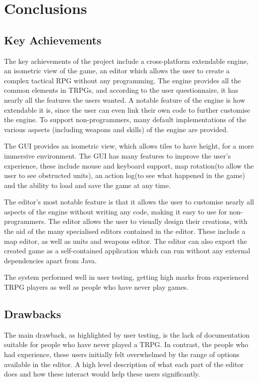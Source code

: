 \section{Conclusions}

\subsection{Key Achievements}

The key achievements of the project include a cross-platform extendable engine, an isometric view of the game, an editor which allows the user to create a complex tactical RPG without any programming. The engine provides all the common elements in TRPGs, and according to the user questionnaire, it has nearly all the features the users wanted.  A notable feature of the engine is how extendable it is, since the user can even link their own code to further customise the engine. To support non-programmers, many default implementations of the various aspects (including weapons and skills) of the engine are provided. 

The GUI provides an isometric view, which allows tiles to have height, for a more immersive environment. The GUI has many features to improve the user's experience, these include mouse and keyboard support, map rotation(to allow the user to see obstructed units), an action log(to see what happened in the game) and the ability to load and save the game at any time.

The editor's most notable feature is that it allows the user to customise nearly all aspects of the engine without writing any code, making it easy to use for non-programmers.  The editor allows the user to visually design their creations,  with the aid of the many specialised editors contained in the editor. These include a map editor, as well as units and weapons editor.  The editor can also export the created game as a self-contained application which can run without any external dependencies apart from Java.

The system performed well in user testing, getting high marks from experienced TRPG players as well as people who have never play games.

\subsection{Drawbacks}
The main drawback, as highlighted by user testing, is the lack of documentation suitable for people who have never played a TRPG. In contrast, the people who had experience, these users initially felt overwhelmed by the range of options available in the editor.  A high level description of what each part of the editor does and how these interact would help these users significantly. 

